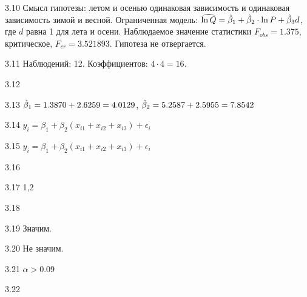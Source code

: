 \protect \hypertarget {soln:3.10}{}
\begin{solution}{{3.10}}
Смысл гипотезы: летом и осенью одинаковая зависимость и одинаковая зависимость зимой и весной. Ограниченная модель: $\widehat{\ln Q}=\hat{\beta}_1+\hat{\beta}_2\cdot{\ln P}+\hat{\beta}_3 d$, где $d$ равна 1 для лета и осени. Наблюдаемое значение статистики $F_{obs}=1.375$, критическое, $F_{cr}=
3.521893
$. Гипотеза не отвергается.
\end{solution}
\protect \hypertarget {soln:3.11}{}
\begin{solution}{{3.11}}
Наблюдений: 12. Коэффициентов: $4 \cdot 4 = 16$.
\end{solution}
\protect \hypertarget {soln:3.12}{}
\begin{solution}{{3.12}}
\end{solution}
\protect \hypertarget {soln:3.13}{}
\begin{solution}{{3.13}}
$\hat{\beta}_1=1.3870+2.6259=4.0129$, $\hat{\beta}_2=5.2587+2.5955=7.8542$
\end{solution}
\protect \hypertarget {soln:3.14}{}
\begin{solution}{{3.14}}
$y_i=\beta_1+\beta_2(x_{i1}+x_{i2}+x_{i3})+\epsilon_{i}$
\end{solution}
\protect \hypertarget {soln:3.15}{}
\begin{solution}{{3.15}}
$y_i=\beta_1+\beta_2(x_{i1}+x_{i2}+x_{i3})+\epsilon_{i}$
\end{solution}
\protect \hypertarget {soln:3.16}{}
\begin{solution}{{3.16}}
\end{solution}
\protect \hypertarget {soln:3.17}{}
\begin{solution}{{3.17}}
1,2
\end{solution}
\protect \hypertarget {soln:3.18}{}
\begin{solution}{{3.18}}
\end{solution}
\protect \hypertarget {soln:3.19}{}
\begin{solution}{{3.19}}
Значим.
\end{solution}
\protect \hypertarget {soln:3.20}{}
\begin{solution}{{3.20}}
Не значим.
\end{solution}
\protect \hypertarget {soln:3.21}{}
\begin{solution}{{3.21}}
$\alpha>0.09$
\end{solution}
\protect \hypertarget {soln:3.22}{}
\begin{solution}{{3.22}}
\end{solution}
\protect \hypertarget {soln:3.23}{}
